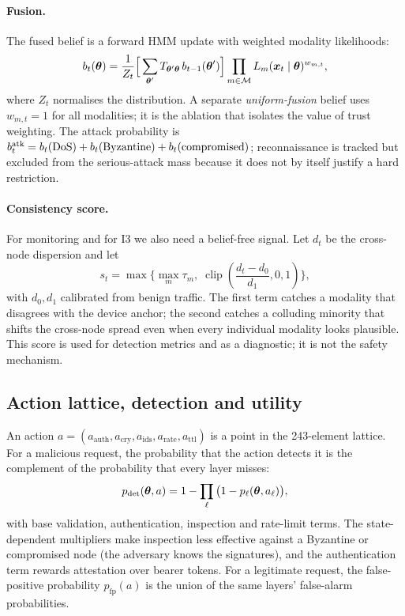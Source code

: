 \paragraph{Fusion.} The fused belief is a forward HMM update with weighted
modality likelihoods:
\begin{equation}
  b_t(\boldsymbol{\theta})=\frac{1}{Z_t}
  \Big[\sum_{\boldsymbol{\theta}'}T_{\boldsymbol{\theta}'\boldsymbol{\theta}}\,b_{t-1}(\boldsymbol{\theta}')\Big]
  \prod_{m\in\mathcal{M}}L_m(\boldsymbol{x}_t\mid\boldsymbol{\theta})^{w_{m,t}},
  \label{eq:fusion}
\end{equation}
where $Z_t$ normalises the distribution. A separate \emph{uniform-fusion} belief
uses $w_{m,t}=1$ for all modalities; it is the ablation that isolates the value
of trust weighting. The attack probability is
$b^{\mathrm{atk}}_t=b_t(\text{DoS})+b_t(\text{Byzantine})+b_t(\text{compromised})$;
reconnaissance is tracked but excluded from the serious-attack mass because it
does not by itself justify a hard restriction.

\paragraph{Consistency score.} For monitoring and for I3 we also need a
belief-free signal. Let $d_t$ be the cross-node dispersion and let
\begin{equation}
  s_t=\max\Big\{\max_{m}\tau_m,\;
  \operatorname{clip}\!\left(\frac{d_t-d_0}{d_1},0,1\right)\Big\},
  \label{eq:consistency}
\end{equation}
with $d_0,d_1$ calibrated from benign traffic. The first term catches a modality
that disagrees with the device anchor; the second catches a colluding minority
that shifts the cross-node spread even when every individual modality looks
plausible. This score is used for detection metrics and as a diagnostic; it is
not the safety mechanism.

\subsection{Action lattice, detection and utility}
\label{sec:utility}

An action $a=(a_{\mathrm{auth}},a_{\mathrm{cry}},a_{\mathrm{ids}},a_{\mathrm{rate}},a_{\mathrm{ttl}})$
is a point in the 243-element lattice. For a malicious request, the probability
that the action detects it is the complement of the probability that every layer
misses:
\begin{equation}
  p_{\mathrm{det}}(\boldsymbol{\theta},a)=1-\prod_{\ell}\big(1-p_{\ell}(\boldsymbol{\theta},a_\ell)\big),
  \label{eq:detect}
\end{equation}
with base validation, authentication, inspection and rate-limit terms. The
state-dependent multipliers make inspection less effective against a Byzantine
or compromised node (the adversary knows the signatures), and the authentication
term rewards attestation over bearer tokens. For a legitimate request, the
false-positive probability $p_{\mathrm{fp}}(a)$ is the union of the same layers'
false-alarm probabilities.

